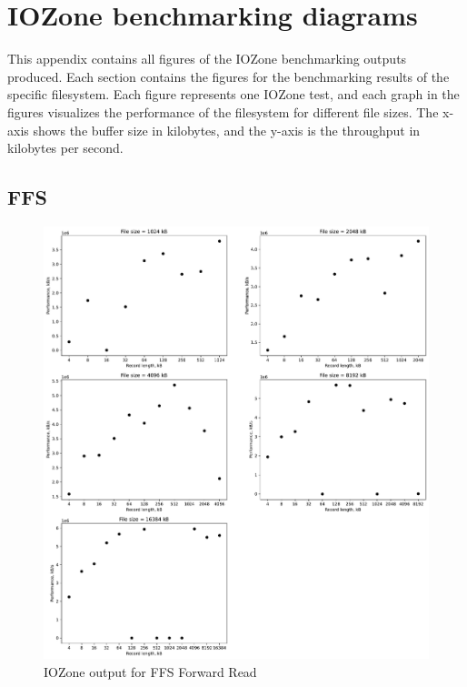 \chapter{IOZone benchmarking diagrams}
This appendix contains all figures of the IOZone benchmarking outputs produced. Each section contains the figures for the benchmarking results of the specific filesystem. Each figure represents one IOZone test, and each graph in the figures visualizes the performance of the filesystem for different file sizes. The x-axis shows the buffer size in kilobytes, and the y-axis is the throughput in kilobytes per second.

\section{FFS}
\begin{figure}[!htb]
	\label{fig:app_bench_ffs_rnd_read}
	\begin{center}
		\includegraphics[width=1.0\textwidth]{figures/benchmarking/ffs/Reader.pdf}
	\end{center}
	\caption{IOZone output for FFS Forward Read}
\end{figure}

